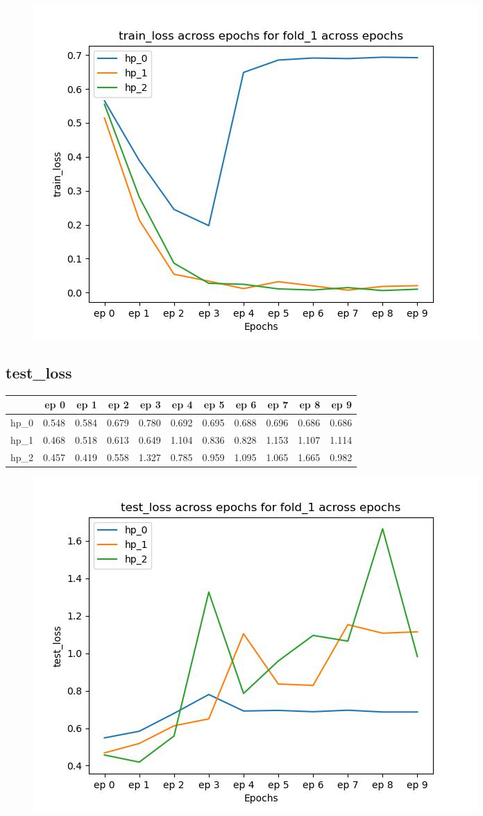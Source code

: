 \documentclass{article}
\begin{document}
\begin{figure}[H]
\includegraphics[scale = 0.75]{fold_1/train_loss}
\end{figure}
\subsection{test\_loss}
\begin{tabular}{lrrrrrrrrrr}
\toprule
{} &   ep 0 &   ep 1 &   ep 2 &   ep 3 &   ep 4 &   ep 5 &   ep 6 &   ep 7 &   ep 8 &   ep 9 \\
\midrule
hp\_0 &  0.548 &  0.584 &  0.679 &  0.780 &  0.692 &  0.695 &  0.688 &  0.696 &  0.686 &  0.686 \\
hp\_1 &  0.468 &  0.518 &  0.613 &  0.649 &  1.104 &  0.836 &  0.828 &  1.153 &  1.107 &  1.114 \\
hp\_2 &  0.457 &  0.419 &  0.558 &  1.327 &  0.785 &  0.959 &  1.095 &  1.065 &  1.665 &  0.982 \\
\bottomrule
\end{tabular}

\begin{figure}[H]
\includegraphics[scale = 0.75]{fold_1/test_loss}
\end{figure}
\end{document}
